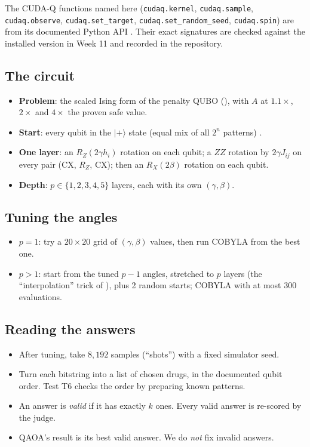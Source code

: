 The CUDA-Q functions named here (\texttt{cudaq.kernel}, \texttt{cudaq.sample}, \texttt{cudaq.observe}, \texttt{cudaq.set\_target}, \texttt{cudaq.set\_random\_seed}, \texttt{cudaq.spin}) are from its documented Python API \cite{cudaq_docs}. Their exact signatures are checked against the installed version in Week 11 and recorded in the repository.

\subsection{The circuit}

\begin{itemize}
\item \textbf{Problem}: the scaled Ising form of the penalty QUBO (), with $A$ at $1.1\times$, $2\times$ and $4\times$ the proven safe value.
\item \textbf{Start}: every qubit in the $|+\rangle$ state (equal mix of all $2^n$ patterns) \cite{farhi2014qaoa}.
\item \textbf{One layer}: an $R_Z(2\gamma h_i)$ rotation on each qubit; a $ZZ$ rotation by $2\gamma J_{ij}$ on every pair (CX, $R_Z$, CX); then an $R_X(2\beta)$ rotation on each qubit.
\item \textbf{Depth}: $p\in\{1,2,3,4,5\}$ layers, each with its own $(\gamma,\beta)$.
\end{itemize}

\subsection{Tuning the angles}

\begin{itemize}
\item $p=1$: try a $20\times 20$ grid of $(\gamma,\beta)$ values, then run COBYLA from the best one.
\item $p>1$: start from the tuned $p-1$ angles, stretched to $p$ layers (the ``interpolation'' trick of \cite{zhou2020qaoa}), plus 2 random starts; COBYLA with at most 300 evaluations.
\end{itemize}

\subsection{Reading the answers}

\begin{itemize}
\item After tuning, take $8{,}192$ samples (``shots'') with a fixed simulator seed.
\item Turn each bitstring into a list of chosen drugs, in the documented qubit order. Test T6 checks the order by preparing known patterns.
\item An answer is \emph{valid} if it has exactly $k$ ones. Every valid answer is re-scored by the judge.
\item QAOA's result is its best valid answer. We do \emph{not} fix invalid answers.
\end{itemize}

